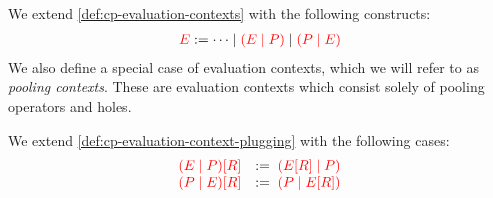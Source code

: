 \begin{definition}\label{def:nc-evaluation-contexts}
  We extend \cref{def:cp-evaluation-contexts} with the following constructs:
  \begin{align*}
    \textcolor{red}{E} := \dots \mid \textcolor{red}{(E \mid P)} \mid \textcolor{red}{(P \mid E)}
  \end{align*}
  We also define a special case of evaluation contexts, which we will refer to
  as \emph{pooling contexts}. These are evaluation contexts which consist solely
  of pooling operators and holes.
\end{definition}
\begin{definition}[Plugging]\label{def:nc-evaluation-context-plugging}
  We extend \cref{def:cp-evaluation-context-plugging} with the following cases:
  \begin{gather*}
    \begin{array}{ll}
      \textcolor{red}{{(E \mid P)}[{R}]}
      & := \; \textcolor{red}{({E}[{R}] \mid P)}
      \\
      \textcolor{red}{{(P \mid E)}[{R}]}
      & := \; \textcolor{red}{(P \mid {E}[{R}])}
    \end{array}
  \end{gather*}
\end{definition}
